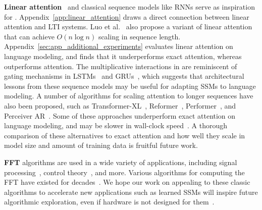 \textbf{Linear attention}~\citep{katharopoulos2020transformers} and classical sequence models like RNNs serve as inspiration for \hthree.
Appendix~\ref{app:linear_attention} draws a direct connection between linear attention and LTI systems.
Luo et al.~\citep{luo2021stable} also propose a variant of linear attention that can achieve $O(n \log n)$ scaling in sequence length.
Appendix~\ref{sec:app_additional_experiments} evaluates linear attention on language modeling, and finds that it underperforms exact attention, whereas \hthree outperforms attention.
The multiplicative interactions in \hthree are reminiscent of gating mechanisms in LSTMs~\citep{hochreiter1996lstm} and GRUs~\citep{cho2014properties}, which suggests that architectural lessons from these sequence models may be useful for adapting SSMs to language modeling.
A number of algorithms for scaling attention to longer sequences have also been proposed, such as Transformer-XL~\citep{dai2019transformer}, Reformer~\citep{kitaev2020reformer}, Performer~\citep{choromanski2020rethinking}, and Perceiver AR~\citep{hawthorne2022general}.
Some of these approaches underperform exact attention on language modeling, and may be slower in wall-clock speed~\citep{dao2022flashattention}.
A thorough comparison of these alternatives to exact attention and how well they scale in model size and amount of training data is fruitful future work.

\textbf{FFT} algorithms are used in a wide variety of applications, including signal processing~\citep{oppenheim1978applications}, control theory~\citep{brogan1974modern}, and more.
Various algorithms for computing the FFT have existed for decades~\citep{oppenheim2001discrete}.
We hope our work on appealing to these classic algorithms to accelerate new applications such as learned SSMs will inspire future algorithmic exploration, even if hardware is not designed for them~\citep{hooker2021hardware}.

